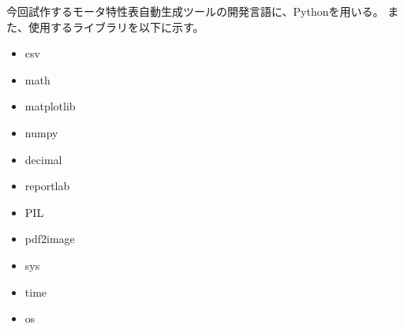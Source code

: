 今回試作するモータ特性表自動生成ツールの開発言語に、Pythonを用いる。
また、使用するライブラリを以下に示す。
\begin{itemize}
	\item csv
	\item math
	\item matplotlib
	\item numpy
	\item decimal
	\item reportlab
	\item PIL
	\item pdf2image
	\item sys
	\item time
	\item os
\end{itemize}


